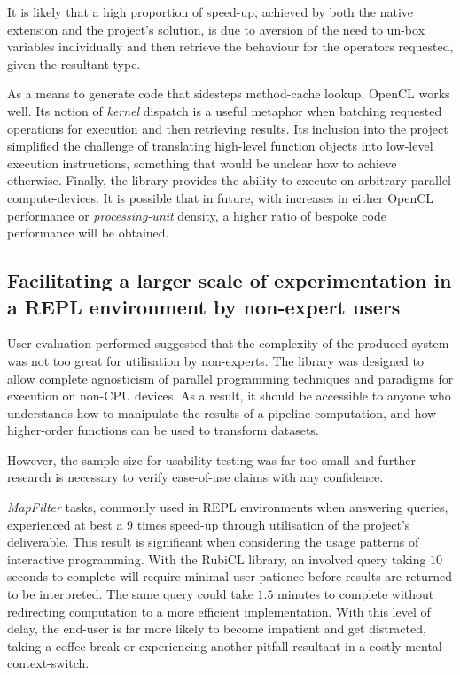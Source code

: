 It is likely that a high proportion of speed-up, achieved by both the native extension and the project's solution, is due to aversion of the need to un-box variables individually and then retrieve the behaviour for the operators requested, given the resultant type.

As a means to generate code that sidesteps method-cache lookup, \ac{OpenCL} works well. Its notion of \emph{kernel} dispatch is a useful metaphor when batching requested operations for execution and then retrieving results. Its inclusion into the project simplified the challenge of translating high-level function objects into low-level execution instructions, something that would be unclear how to achieve otherwise. Finally, the library provides the ability to execute on arbitrary parallel compute-devices. It is possible that in future, with increases in either \ac{OpenCL} performance or \emph{processing-unit} density, a higher ratio of bespoke code performance will be obtained.
\subsection{Facilitating a larger scale of experimentation in a REPL environment by non-expert users}
User evaluation performed suggested that the complexity of the produced system was not too great for utilisation by non-experts. The library was designed to allow complete agnosticism of parallel programming techniques and paradigms for execution on non-\ac{CPU} devices. As a result, it should be accessible to anyone who understands how to manipulate the results of a pipeline computation, and how higher-order functions can be used to transform datasets.

However, the sample size for usability testing was far too small and further research is necessary to verify ease-of-use claims with any confidence.

\emph{MapFilter} tasks, commonly used in \ac{REPL} environments when answering queries, experienced at best a $9$ times speed-up through utilisation of the project's deliverable. This result is significant when considering the usage patterns of interactive programming. With the RubiCL library, an involved query taking $10$ seconds to complete will require minimal user patience before results are returned to be interpreted. The same query could take $1.5$ minutes to complete without redirecting computation to a more efficient implementation. With this level of delay, the end-user is far more likely to become impatient and get distracted, taking a coffee break or experiencing another pitfall resultant in a costly mental context-switch.

